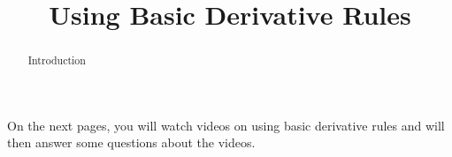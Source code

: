 \documentclass[handout]{ximera}
\title{Using Basic Derivative Rules}
\begin{document}
\begin{abstract} Introduction %
\end{abstract}

\maketitle

On the next pages, you will watch videos on using basic derivative rules and will then answer some questions about the videos.
\end{document}
